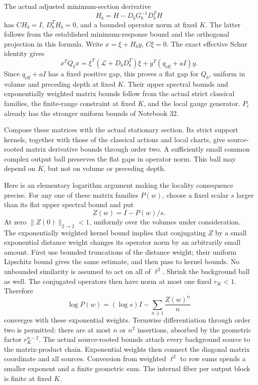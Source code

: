 \documentclass[11pt]{article}
\theoremstyle{remark}
\begin{document}
The actual adjusted minimum-section derivative
\[
 H_b=H-D_bG_b^{-1}D_b^TH
\]
has \(CH_b=I\), \(D_b^TH_b=0\), and a bounded operator norm
at fixed \(K\). The latter follows from the established
minimum-response bound and the orthogonal projection
in this formula. Write \(x=\xi+H_by\), \(C\xi=0\).
The exact effective Schur identity gives
\[
 x^TQ_bx
  =\xi^T(\mathcal L+D_bD_b^T)\xi
                         +y^T(q_{\mathrm{eff}}+aI)y.
\]
Since \(q_{\mathrm{eff}}+aI\) has a fixed positive gap,
this proves a flat gap for \(Q_b\), uniform in volume
and preceding depth at fixed \(K\). Their upper spectral
bounds and exponentially weighted matrix bounds follow
from the actual strict classical families, the finite-range
constraint at fixed \(K\), and the local gauge generator.
\(P_c\) already has the stronger uniform bounds of Notebook 32.

Compose these matrices with the actual stationary section.
Its strict support kernels, together with those of the
classical actions and local charts, give source-rooted
matrix derivative bounds through order two. A sufficiently
small common complex output ball preserves the flat
gaps in operator norm. This ball may depend on \(K\),
but not on volume or preceding depth.

Here is an elementary logarithm argument making the
locality consequence precise. For any one of these
matrix families \(P(w)\), choose a fixed scalar \(s\)
larger than its flat upper spectral bound and put
\[
 Z(w)=I-P(w)/s.
\]
At zero \(\|Z(0)\|_{2\to2}<1\), uniformly over the
volumes under consideration. The exponentially weighted
kernel bound implies that conjugating \(Z\) by a small
exponential distance weight changes its operator norm
by an arbitrarily small amount. First use bounded
truncations of the distance weight; their uniform
Lipschitz bound gives the same estimate, and then pass
to kernel bounds. No unbounded similarity is assumed
to act on all of \(\ell^2\). Shrink the background
ball as well. The conjugated operators then have norm
at most one fixed \(r_K<1\). Therefore
\begin{equation}
 \log P(w)=(\log s)I-\sum_{n\ge1}\frac{Z(w)^n}{n}
 \label{gdd-log-series}
\end{equation}
converges with these exponential weights.
Termwise differentiation through order two is permitted:
there are at most \(n\) or \(n^2\) insertions, absorbed
by the geometric factor \(r_K^{n-2}\).
The actual source-rooted bounds attach every background
source to the matrix-product chain. Exponential weights
then connect the diagonal matrix coordinate and all
sources. Conversion from weighted \(\ell^2\) to row
sums spends a smaller exponent and a finite geometric
sum. The internal fiber per output block is finite
at fixed \(K\).
\end{document}
